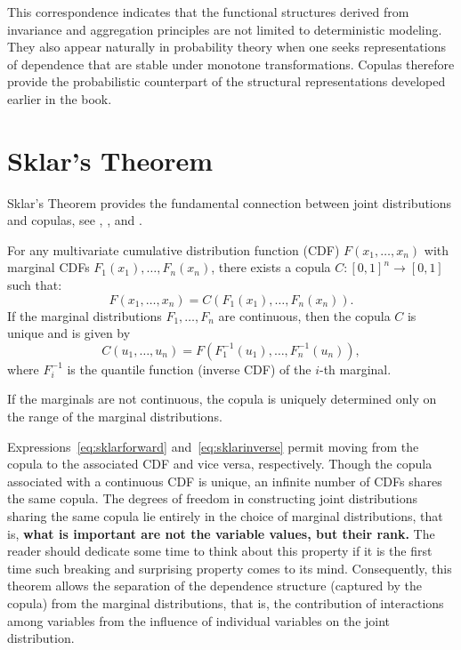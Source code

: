 This correspondence indicates that the functional structures derived from invariance
and aggregation principles are not limited to deterministic modeling. They also appear
naturally in probability theory when one seeks representations of dependence that are
stable under monotone transformations. Copulas therefore provide the probabilistic
counterpart of the structural representations developed earlier in the book.

\section{Sklar's Theorem}\label{sec:sklar}
Sklar's Theorem provides the fundamental connection between joint distributions and copulas, see \cite{Sklar1959}, \cite{Schweizer1983}, \cite{Sklar1996} and \cite{Joe2014}.
\begin{theorem}
\label{thm:sklar}
For any multivariate cumulative distribution function (CDF) $F(x_1,\ldots, x_n)$ with marginal CDFs $F_1(x_1),\ldots,F_n(x_n)$, there exists a copula $C : [0,1]^n \to [0,1]$ such that:
\begin{equation}
F(x_1,\ldots, x_n) = C(F_1(x_1),\ldots,F_n(x_n)).
\label{eq:sklarforward}
\end{equation}
If the marginal distributions $F_1,\ldots,F_n$ are continuous, then the copula $C$ is unique and is given by
\begin{equation}
C(u_1,\ldots,u_n) = F(F_1^{-1}(u_1),\ldots,F_n^{-1}(u_n)),
\label{eq:sklarinverse}
\end{equation}
where $F_i^{-1}$ is the quantile function (inverse CDF) of the $i$-th marginal.
\end{theorem}

If the marginals are not continuous, the copula is uniquely determined only on the
range of the marginal distributions.

Expressions~\eqref{eq:sklarforward} and~\eqref{eq:sklarinverse} permit moving from the copula to the associated CDF and vice versa, respectively. Though the copula associated with a continuous CDF is unique, an infinite number of CDFs shares the same copula. The degrees of freedom in constructing joint distributions sharing the same copula
lie entirely in the choice of marginal distributions, that is, \textbf{what is important are not the variable values, but their rank.} The reader should dedicate some time to think about this property if it is the first time such breaking and surprising property comes to its mind.
Consequently, this theorem allows the separation of the dependence structure (captured by the copula) from the marginal distributions, that is, the contribution of interactions among variables from the influence of individual variables on the joint distribution.

